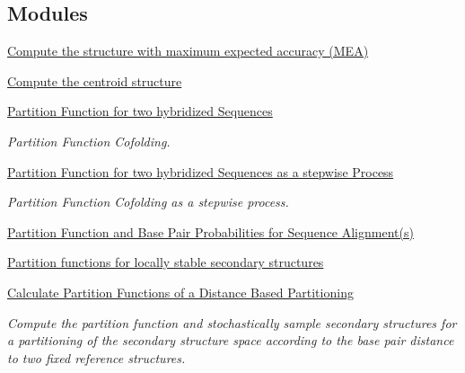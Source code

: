 \subsection*{Modules}
\begin{DoxyCompactItemize}
\item 
\hyperlink{group__mea__fold}{Compute the structure with maximum expected accuracy (\+M\+E\+A)}
\item 
\hyperlink{group__centroid__fold}{Compute the centroid structure}
\item 
\hyperlink{group__pf__cofold}{Partition Function for two hybridized Sequences}
\begin{DoxyCompactList}\small\item\em Partition Function Cofolding. \end{DoxyCompactList}\item 
\hyperlink{group__up__cofold}{Partition Function for two hybridized Sequences as a stepwise Process}
\begin{DoxyCompactList}\small\item\em Partition Function Cofolding as a stepwise process. \end{DoxyCompactList}\item 
\hyperlink{group__consensus__pf__fold}{Partition Function and Base Pair Probabilities for Sequence Alignment(s)}
\item 
\hyperlink{group__local__pf__fold}{Partition functions for locally stable secondary structures}
\item 
\hyperlink{group__kl__neighborhood__pf}{Calculate Partition Functions of a Distance Based Partitioning}
\begin{DoxyCompactList}\small\item\em Compute the partition function and stochastically sample secondary structures for a partitioning of the secondary structure space according to the base pair distance to two fixed reference structures. \end{DoxyCompactList}\end{DoxyCompactItemize}
